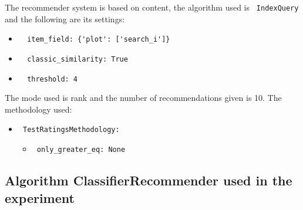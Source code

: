 \documentclass[11pt]{article}
\begin{document}
The recommender system is based on content, the algorithm used
is \verb| IndexQuery | and the following are its settings:
\begin{itemize}
 \item \begin{verbatim}
  item_field: {'plot': ['search_i']}
\end{verbatim}
 \item \begin{verbatim}
  classic_similarity: True
\end{verbatim}
 \item \begin{verbatim}
  threshold: 4
\end{verbatim}
\end{itemize}
\hfill\break
The mode used is rank and the number of recommendations given
is 10.
The methodology used:
\begin{itemize}
    \item \verb| TestRatingsMethodology:|
    \begin{itemize}
                    \item \verb| only_greater_eq: None |
            \end{itemize}
\end{itemize}
\hfill\break






\subsection{Algorithm ClassifierRecommender used in the experiment}\label{subsec:algo_ClassifierRecommender}
\end{document}
